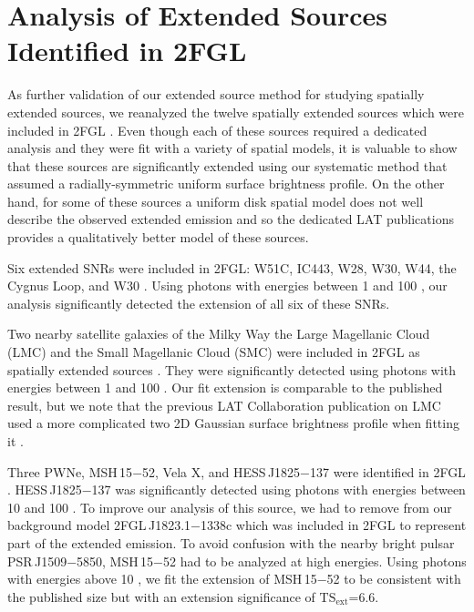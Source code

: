 \documentclass[12pt,preprint]{aastex}
\newcommand{\gev}{\text{GeV}\xspace}
\newcommand{\tsext}{{\ensuremath{\text{TS}_{\text{ext}}}}\xspace}
\begin{document}
\section{Analysis of Extended Sources Identified in 2FGL}
\label{validate_known}

As further validation of our extended source method for studying
spatially extended sources, we reanalyzed the twelve spatially extended
sources which were included in 2FGL \citep{second_cat}.  Even though
each of these sources required a dedicated analysis and they
were fit with a variety of spatial models, it is valuable to show that
these sources are significantly extended using our systematic 
method that assumed a radially-symmetric uniform surface
brightness profile.  On the other hand, for some of
these sources a uniform disk spatial model does not well describe the
observed extended emission and so the dedicated LAT publications provides
a qualitatively better model of these sources.



Six extended SNRs were
included in 2FGL: W51C, IC443, W28, W30, W44, the Cygnus Loop,
and W30
\citep{w51c,ic443,w28,w44,cygnus_loop_lat,w30_lat}.
Using photons
with energies between
1 \gev and 100 \gev, our analysis significantly detected
the extension of all six of these SNRs.


Two nearby satellite galaxies of the Milky Way the Large Magellanic Cloud (LMC)
and the Small Magellanic
Cloud (SMC) were included in 2FGL as spatially extended sources \citep{lmc,smc}.  They were significantly
detected using photons with energies between
1 \gev and 100 \gev. Our
fit extension is comparable to the published result, but we note that
the previous LAT Collaboration publication on LMC used a more complicated two 2D Gaussian surface
brightness profile when fitting it \citep{lmc}.

Three PWNe, MSH\,15$-$52, Vela X, and HESS\,J1825$-$137 were
identified in 2FGL \citep{msh1552,velax,fermi_hess_j1825}.  
HESS\,J1825$-$137 was significantly detected using photons
with energies between 10 \gev and 100 \gev.
To improve our analysis of this source, we had to remove
from our background model 
2FGL\,J1823.1$-$1338c which was included in 2FGL to
represent part of the extended emission.
To avoid confusion with the nearby bright pulsar PSR\,J1509$-$5850, MSH\,15$-$52 had
to be
analyzed at high energies.  Using photons with energies above 10 \gev,
we fit the extension of MSH\,15$-$52 to be consistent with the published
size but with an extension significance of \tsext=6.6.
\end{document}
